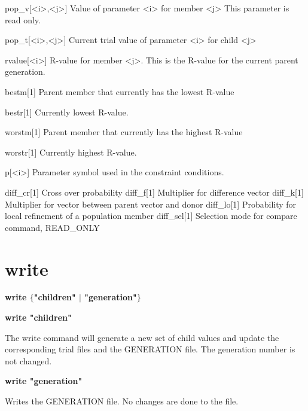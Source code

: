 \begin{MacVerbatim}
pop_v[<i>,<j>] Value of parameter <i> for member <j>
              This parameter is read only.

pop_t[<i>,<j>] Current trial value of parameter <i> for child <j>

rvalue[<i>]   R-value for member <j>. This is the R-value for the
              current parent generation.

bestm[1]      Parent member that currently has the lowest R-value

bestr[1]      Currently lowest R-value.

worstm[1]     Parent member that currently has the highest R-value

worstr[1]     Currently highest R-value.

p[<i>]        Parameter symbol used in the constraint conditions.

diff_cr[1]    Cross over probability
diff_f[1]     Multiplier for difference vector
diff_k[1]     Multiplier for vector between parent vector and donor
diff_lo[1]    Probability for local refinement of a population member
diff_sel[1]   Selection mode for compare command, READ_ONLY
\end{MacVerbatim}
\section{write}
{\bf write $ \{$"children" $| $ "generation"$\} $ \par }
\par
{\bf write "children" \par }
\vspace{3pt}
The write command will generate a new set of child values and update 
the corresponding trial files and the GENERATION file. The generation 
number is not changed. 
\par
{\bf write "generation" \par }
\vspace{3pt}
Writes the GENERATION file. No changes are done to the file. 
